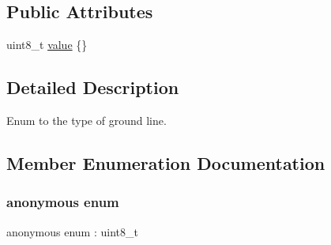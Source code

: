 \subsection*{Public Attributes}
\begin{DoxyCompactItemize}
\item 
uint8\+\_\+t \hyperlink{structmaf__perception__interface_1_1GroundLineTypeEnum_adf2a155e33a6b485bdaaab85d1adbc49}{value} \{\}
\end{DoxyCompactItemize}


\subsection{Detailed Description}
Enum to the type of ground line. 

\subsection{Member Enumeration Documentation}
\mbox{\label{structmaf__perception__interface_1_1GroundLineTypeEnum_a16308543c4f0be36974963e9cfea1b46}} 
\subsubsection{\texorpdfstring{anonymous enum}{anonymous enum}}
{\footnotesize\ttfamily anonymous enum \+: uint8\+\_\+t}

